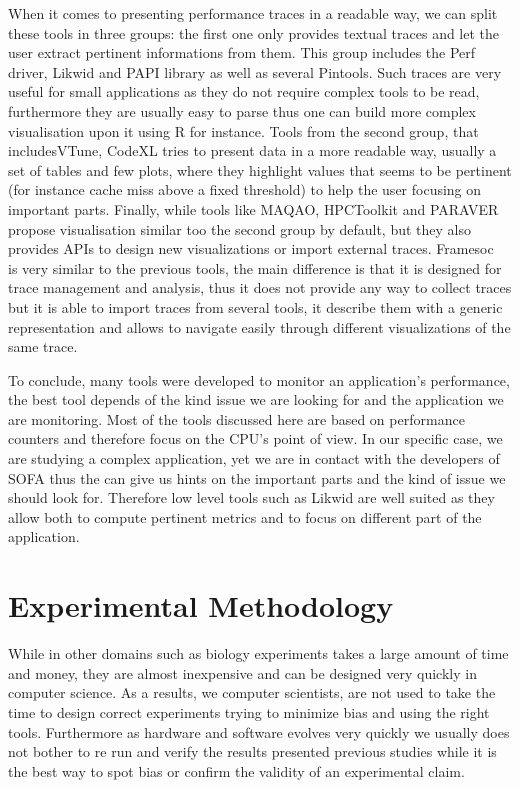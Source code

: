 When it comes to presenting performance traces in a readable way, we can split these tools in three groups: the first one only provides textual traces and let the user extract pertinent informations from them.
This group includes the \gls{Perf} driver, \gls{Likwid} and \gls{PAPI} library as well as several \glspl{Pintool}.
Such traces are very useful for small applications as they do not require complex tools to be read, furthermore they are usually easy to parse thus one can build more complex visualisation upon it using \gls{R} for instance.
Tools from the second group, that includes\gls{VTune}, \gls{CodeXL} tries to present data in a more readable way, usually a set of tables and few plots, where they highlight values that seems to be pertinent (for instance cache miss above a fixed threshold) to help the user focusing on important parts.
Finally, while tools like \gls{MAQAO}, \gls{HPCToolkit} and \gls{PARAVER} propose visualisation similar too the second group by default, but they also provides \glspl{API} to design new visualizations or import external traces.
\gls{Framesoc}~\cite{Pagano13Trace} is very similar to the previous tools, the main difference is that it is designed for trace management and analysis, thus it does not provide any way to collect traces but it is able to import traces from several tools, it  describe them with a generic representation and allows to navigate easily through different visualizations of the same trace.

To conclude, many tools were developed to monitor an application's performance, the best tool depends of the kind issue we are looking for and the application we are monitoring.
Most of the tools discussed here are based on performance counters and therefore focus on the \gls{CPU}'s point of view.
In our specific case, we are studying a complex application, yet we are in contact with the developers of \gls{SOFA} thus the can give us hints on the important parts and the kind of issue we should look for.
Therefore low level tools such as \gls{Likwid} are well suited as they allow both to compute pertinent metrics and to focus on different part of the application.

\section{Experimental Methodology}
\label{sec:expe-methodo}

While in other domains such as biology experiments takes a large amount of time and money, they are almost inexpensive and can be designed very quickly in computer science.
As a results, we computer scientists, are not used to take the time to design correct experiments trying to minimize bias and using the right tools.
Furthermore as hardware and software evolves very quickly we usually does not bother to re run and verify the results presented previous studies while it is the best way to spot bias or confirm the validity of an experimental claim.

